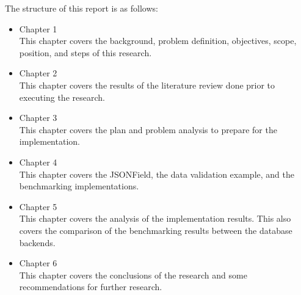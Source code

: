 The structure of this report is as follows:

\begin{itemize}
    \item Chapter 1 \babSatu \\
        This chapter covers the background, problem definition, objectives,
        scope, position, and steps of this research.
    \item Chapter 2 \babDua \\
        This chapter covers the results of the literature review done prior to
        executing the research.
    \item Chapter 3 \babTiga \\
        This chapter covers the plan and problem analysis to prepare for the
        implementation.
    \item Chapter 4 \babEmpat \\
        This chapter covers the JSONField, the data validation example, and
        the benchmarking implementations.
    \item Chapter 5 \babLima \\
        This chapter covers the analysis of the implementation results. This
        also covers the comparison of the benchmarking results between the
        database backends.
    \item Chapter 6 \kesimpulan \\
        This chapter covers the conclusions of the research and some
        recommendations for further research.
\end{itemize}
